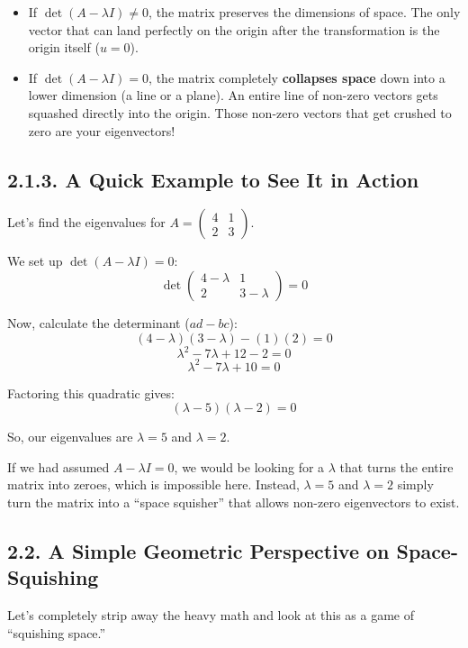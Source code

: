 \documentclass{article}
\begin{document}
\begin{itemize}
    \item If $\det(A - \lambda I) \neq 0$, the matrix preserves the dimensions of space. The only vector that can land perfectly on the origin after the transformation is the origin itself ($u = 0$).
    \item If $\det(A - \lambda I) = 0$, the matrix completely \textbf{collapses space} down into a lower dimension (a line or a plane). An entire line of non-zero vectors gets squashed directly into the origin. Those non-zero vectors that get crushed to zero are your eigenvectors!
\end{itemize}

\subsection*{2.1.3. A Quick Example to See It in Action}

Let's find the eigenvalues for $A = \begin{pmatrix} 4 & 1 \\ 2 & 3 \end{pmatrix}$.

We set up $\det(A - \lambda I) = 0$:
\[ \det \begin{pmatrix} 4-\lambda & 1 \\ 2 & 3-\lambda \end{pmatrix} = 0 \]

Now, calculate the determinant ($ad - bc$):
\[ (4-\lambda)(3-\lambda) - (1)(2) = 0 \]
\[ \lambda^2 - 7\lambda + 12 - 2 = 0 \]
\[ \lambda^2 - 7\lambda + 10 = 0 \]

Factoring this quadratic gives:
\[ (\lambda - 5)(\lambda - 2) = 0 \]

So, our eigenvalues are $\lambda = 5$ and $\lambda = 2$. 

If we had assumed $A - \lambda I = 0$, we would be looking for a $\lambda$ that turns the entire matrix into zeroes, which is impossible here. Instead, $\lambda = 5$ and $\lambda = 2$ simply turn the matrix into a ``space squisher'' that allows non-zero eigenvectors to exist.

\subsection*{2.2. A Simple Geometric Perspective on Space-Squishing}

Let’s completely strip away the heavy math and look at this as a game of ``squishing space.'' 
\end{document}
